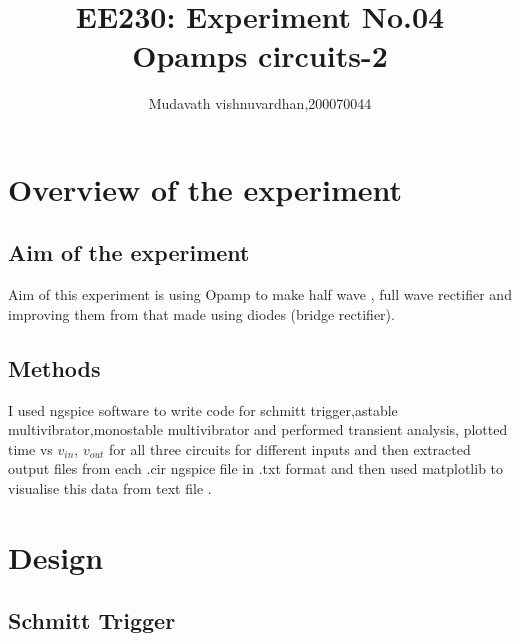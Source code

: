 \documentclass[12pt]{article}
\title{EE230: Experiment No.04\\
Opamps circuits-2\\}
\author{Mudavath vishnuvardhan,200070044}
\begin{document}
\maketitle

\section{Overview of the experiment} %

\subsection{Aim of the experiment}%
Aim of this experiment is using Opamp to make half wave , full wave rectifier and improving them from that made using diodes (bridge rectifier).

\subsection{ Methods}

I used ngspice software to write code for schmitt trigger,astable multivibrator,monostable multivibrator and performed transient analysis, plotted time vs \(v_{in}\), \(v_{out}\) for all three circuits for different inputs and then extracted output files from each .cir ngspice file in .txt format and then used matplotlib to visualise this data from text file .
\newpage

\section{Design}%

\subsection{Schmitt Trigger}
\end{document}
